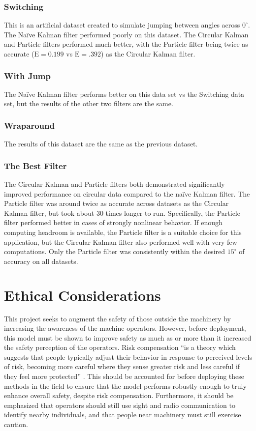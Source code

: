 \documentclass[11pt]{amsart}
\begin{document}
\subsubsection{Switching}
This is an artificial dataset created to simulate jumping between angles across $0^{\circ}$. The Naïve Kalman filter performed poorly on this dataset. The Circular Kalman and Particle filters performed much better, with the Particle filter being twice as accurate ($\mathrm{E}=0.199$ vs $\mathrm{E}=.392$) as the Circular Kalman filter.
\subsubsection{With Jump}
The Naïve Kalman filter performs better on this data set vs the Switching data set, but the results of the other two filters are the same.
\subsubsection{Wraparound}
The results of this dataset are the same as the previous dataset.
\subsubsection{The Best Filter}
The Circular Kalman and Particle filters both demonstrated significantly improved performance on circular data compared to the naïve Kalman filter. The Particle filter was around twice as accurate across datasets as the Circular Kalman filter, but took about 30 times longer to run. Specifically, the Particle filter performed better in cases of strongly nonlinear behavior. If enough computing headroom is available, the Particle filter is a suitable choice for this application, but the Circular Kalman filter also performed well with very few computations. Only the Particle filter was consistently within the desired $15^{\circ}$ of accuracy on all datasets.

\section{Ethical Considerations}
This project seeks to augment the safety of those outside the machinery by increasing the awareness of the machine operators. However, before deployment, this model must be 
shown to improve safety as much as or more than it increased the safety perception of the operators. Risk compensation “is a theory which suggests that people typically adjust 
their behavior in response to perceived levels of risk, becoming more careful where they sense greater risk and less careful if they feel more protected” \cite{Risk}. This should 
be accounted for before deploying these methods in the field to ensure that the model performs robustly enough to truly enhance overall safety, despite risk compensation. Furthermore, 
it should be emphasized that operators should still use sight and radio communication to identify nearby individuals, and that people near machinery must still exercise caution. 
\end{document}
